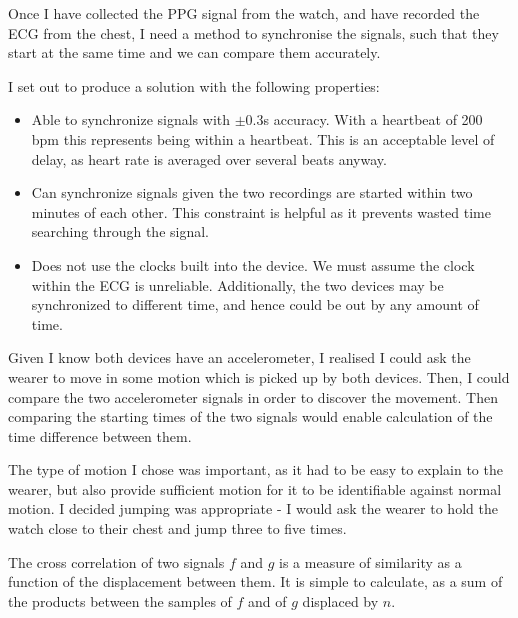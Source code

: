 \documentclass[12pt,a4paper,twoside,openright]{report}
\begin{document}
Once I have collected the PPG signal from the watch, and have recorded the ECG
from the chest, I need a method to synchronise the signals, such that they
start at the same time and we can compare them accurately.

I set out to produce a solution with the following properties:
\begin{itemize}
	\item Able to synchronize signals with \(\pm0.3\)s accuracy. With a
		heartbeat of 200 bpm this represents being within a heartbeat.
		This is an acceptable level of delay, as heart rate is
		averaged over several beats anyway.

	\item Can synchronize signals given the two recordings are started
		within two minutes of each other. This constraint is helpful
		as it prevents wasted time searching through the signal.

	\item Does not use the clocks built into the device. We must assume
		the clock within the ECG is unreliable. Additionally, the two
		devices may be synchronized to different time, and hence could
		be out by any amount of time.
\end{itemize}

Given I know both devices have an accelerometer, I realised I could ask the
wearer to move in some motion which is picked up by both devices. Then, I
could compare the two accelerometer signals in order to discover the
movement. Then comparing the starting times of the two signals would enable
calculation of the time difference between them.

The type of motion I chose was important, as it had to be easy to explain to
the wearer, but also provide sufficient motion for it to be identifiable
against normal motion. I decided jumping was appropriate -
I would ask the wearer to hold the watch close to their chest and jump three
to five times.

The cross correlation of two signals \(f\) and \(g\) is a measure of
similarity as a function of the displacement between them. It is simple to
calculate, as a sum of the products between the samples of \(f\) and of \(g\)
displaced by \(n\).
\end{document}
